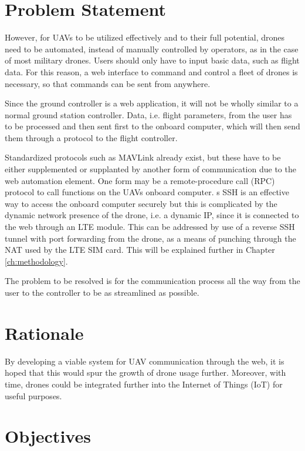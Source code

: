 \section{Problem Statement}

However, for UAVs to be utilized effectively and to their full potential, drones need to be automated, instead of manually controlled by operators, as in the case of most military drones. Users should only have to input basic data, such as flight data. For this reason, a web interface to command and control a fleet of drones is necessary, so that commands can be sent from anywhere. 

Since the ground controller is a web application, it will not be wholly similar to a normal ground station controller. Data, i.e. flight parameters, from the user has to be processed and then sent first to the onboard computer, which will then send them through a protocol to the flight controller.

Standardized protocols such as MAVLink already exist, but these have to be either supplemented or supplanted by another form of communication due to the web automation element. One form may be a remote-procedure call (RPC) protocol to call functions on the UAV\textquotesingle s onboard computer. 
s
SSH is an effective way to access the onboard computer securely but this is complicated by the dynamic network presence of the drone, i.e. a dynamic IP, since it is connected to the web through an LTE module. This can be addressed by use of a reverse SSH tunnel with port forwarding from the drone, as a means of punching through the NAT used by the LTE SIM card. This will be explained further in Chapter \ref{ch:methodology}.

The problem to be resolved is for the communication process all the way from the user to the controller to be as streamlined as possible.


\section{Rationale}

By developing a viable system for UAV communication through the web, it is hoped that this would spur the growth of drone usage further. Moreover, with time, drones could be integrated further into the Internet of Things (IoT) for useful purposes.

\section{Objectives}


